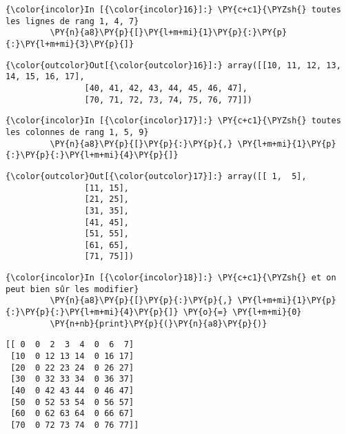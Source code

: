     \begin{Verbatim}[commandchars=\\\{\}]
{\color{incolor}In [{\color{incolor}16}]:} \PY{c+c1}{\PYZsh{} toutes les lignes de rang 1, 4, 7}
         \PY{n}{a8}\PY{p}{[}\PY{l+m+mi}{1}\PY{p}{:}\PY{p}{:}\PY{l+m+mi}{3}\PY{p}{]}
\end{Verbatim}


\begin{Verbatim}[commandchars=\\\{\}]
{\color{outcolor}Out[{\color{outcolor}16}]:} array([[10, 11, 12, 13, 14, 15, 16, 17],
                [40, 41, 42, 43, 44, 45, 46, 47],
                [70, 71, 72, 73, 74, 75, 76, 77]])
\end{Verbatim}
            
    \begin{Verbatim}[commandchars=\\\{\}]
{\color{incolor}In [{\color{incolor}17}]:} \PY{c+c1}{\PYZsh{} toutes les colonnes de rang 1, 5, 9}
         \PY{n}{a8}\PY{p}{[}\PY{p}{:}\PY{p}{,} \PY{l+m+mi}{1}\PY{p}{:}\PY{p}{:}\PY{l+m+mi}{4}\PY{p}{]}
\end{Verbatim}


\begin{Verbatim}[commandchars=\\\{\}]
{\color{outcolor}Out[{\color{outcolor}17}]:} array([[ 1,  5],
                [11, 15],
                [21, 25],
                [31, 35],
                [41, 45],
                [51, 55],
                [61, 65],
                [71, 75]])
\end{Verbatim}
            
    \begin{Verbatim}[commandchars=\\\{\}]
{\color{incolor}In [{\color{incolor}18}]:} \PY{c+c1}{\PYZsh{} et on peut bien sûr les modifier}
         \PY{n}{a8}\PY{p}{[}\PY{p}{:}\PY{p}{,} \PY{l+m+mi}{1}\PY{p}{:}\PY{p}{:}\PY{l+m+mi}{4}\PY{p}{]} \PY{o}{=} \PY{l+m+mi}{0}
         \PY{n+nb}{print}\PY{p}{(}\PY{n}{a8}\PY{p}{)}
\end{Verbatim}


    \begin{Verbatim}[commandchars=\\\{\}]
[[ 0  0  2  3  4  0  6  7]
 [10  0 12 13 14  0 16 17]
 [20  0 22 23 24  0 26 27]
 [30  0 32 33 34  0 36 37]
 [40  0 42 43 44  0 46 47]
 [50  0 52 53 54  0 56 57]
 [60  0 62 63 64  0 66 67]
 [70  0 72 73 74  0 76 77]]

    \end{Verbatim}

